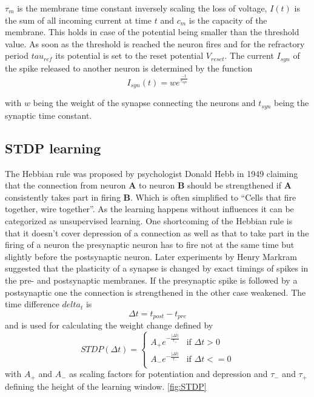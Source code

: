 $\tau_m$ is the membrane time constant inversely scaling the loss of voltage,  $I(t)$ is the sum of all incoming current at time $t$ and $c_m$ is the capacity of the membrane. This holds in case of the potential being smaller than the threshold value. As soon as the threshold is reached the neuron fires and for the refractory period $tau_{ref}$ its potential is set to the reset potential $V_{reset}$. The current $I_{syn}$ of the spike released to another neuron is determined by the function
\begin{equation}
  I_{syn}(t)=we^{\frac{-t}{\tau_{syn}}}
\end{equation}

with $w$ being the weight of the synapse connecting the neurons and $t_{syn}$ being the synaptic time constant.

\subsection{STDP learning}
The Hebbian rule was proposed by psychologist Donald Hebb in 1949 claiming that the connection from neuron \textbf{A} to neuron \textbf{B} should be strengthened if \textbf{A} consistently takes part in firing \textbf{B}. Which is often simplified to “Cells that fire together, wire together”. As the learning happens without influences it can be categorized as unsupervised learning.
One shortcoming of the Hebbian rule is that it doesn’t cover depression of a connection as well as that to take part in the firing of a neuron the presynaptic neuron has to fire not at the same time but slightly before the postsynaptic neuron.
Later experiments by Henry Markram suggested that the plasticity of a synapse is changed by exact timings of spikes in the pre- and postsynaptic membranes. If the presynaptic spike is followed by a postsynaptic one the connection is strengthened in the other case weakened.
The time difference $delta_t$ is
\begin{equation}
  \Delta t = t_{post} - t_{pre}
\end{equation}
and is used for calculating the weight change defined by
\begin{equation}
  STDP(\Delta t) = 
  \begin{cases}
    A_+ e^{-\frac{\vert \Delta t \vert }{\tau_+}} & \text{if $\Delta t>0$} \\
    A_- e^{-\frac{\vert \Delta t \vert }{\tau_-}} & \text{if $\Delta t<=0$} \\
  \end{cases}
\end{equation}
with $A_+$ and $A_-$ as scaling factors for potentiation and depression and $\tau_-$ and $\tau_+$ defining the height of the learning window. \autoref{fig:STDP}

